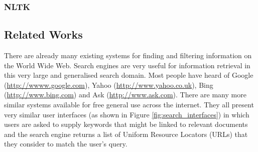 \documentclass[12pt,a4paper]{article}
\begin{document}
\subsubsection{NLTK}

\subsection{Related Works}
\label{sec:prior_art}

There are already many existing systems for finding and filtering information
on the World Wide Web. Search engines are very useful for information retrieval
in this very large and generalised search domain. Most people have heard of
Google (\url{http://wwww.google.com}), Yahoo (\url{http://www.yahoo.co.uk}),
Bing (\url{http://www.bing.com}) and Ask (\url{http://www.ask.com}). There are
many more similar systems available for free general use across the internet.
They all present very similar user interfaces (as shown in Figure
\ref{fig:search_interfaces}) in which users are asked to supply keywords that
might be linked to relevant documents and the search engine returns a list of
Uniform Resource Locators (URLs) that they consider to match the user's query.
\end{document}
